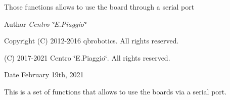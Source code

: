 Those functions allows to use the board through a serial port\begin{DoxyAuthor}{Author}
{\itshape Centro \char`\"{}\+E.\+Piaggio\char`\"{}} 
\end{DoxyAuthor}
\begin{DoxyCopyright}{Copyright}
(C) 2012-\/2016 qbrobotics. All rights reserved. 

(C) 2017-\/2021 Centro \char`\"{}\+E.\+Piaggio\char`\"{}. All rights reserved.
\end{DoxyCopyright}
\begin{DoxyDate}{Date}
February 19th, 2021
\end{DoxyDate}
This is a set of functions that allows to use the boards via a serial port. 